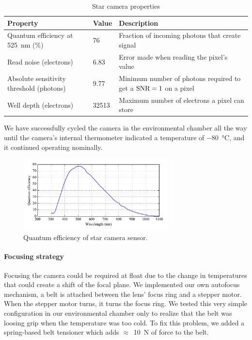 \renewcommand{\arraystretch}{1.5}
\begin{table}[!h]
\small
\caption[Star camera properties]{Star camera properties}
\label{tab:starcamproperties}
\begin{tabular}{P{4cm}|P{1cm}|p{8.5cm}}
\toprule
Property & Value & Description \\
\midrule
Quantum efficiency at \SI{525}{\nm} (\%) & 76 & Fraction of incoming photons that create signal \\

Read noise (electrons) & 6.83 & Error made when reading the pixel's value \\

Absolute sensitivity threshold (photons) & 9.77 & Minimum number of photons required to get a $\textrm{SNR}=1$ on a pixel\\

Well depth (electrons) & \num{32513} & Maximum number of electrons a pixel can store\\
\bottomrule
\end{tabular}
\end{table}



We have successfully cycled the camera in the environmental chamber all the way until the camera's internal thermometer indicated a temperature of \SI{-80}{\celsius}, and it continued operating nominally.

\begin{figure}[!h]
		\centering
		\includegraphics[width=0.7\textwidth]{Figures/QEPtGrey.pdf} 
		\caption[Quantum efficiency of star camera sensor]{Quantum efficiency of star camera sensor.}
		\label{fig:QE_CCD}
\end{figure}


\paragraph{Focusing strategy}
Focusing the camera could be required at float due to the change in temperatures that could create a shift of the focal plane. We implemented our own autofocus mechanism, a belt is attached between the lens' focus ring and a stepper motor. When the stepper motor turns, it turns the focus ring. We tested this very simple configuration in our environmental chamber only to realize that the belt was loosing grip when the temperature was too cold. To fix this problem, we added a spring-based belt tensioner which adds $\approx$~\SI{10}{\newton} of force to the belt.

